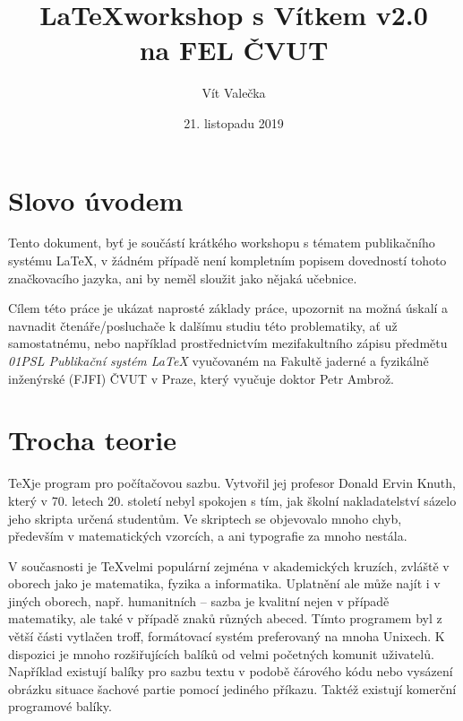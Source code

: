 \documentclass{article}
\title{\textbf{\LaTeX\enspace workshop s Vítkem v2.0}\\
	\uv{Studenti studentům} na FEL ČVUT}
\date{21. listopadu 2019}
\author{Vít Valečka}
\begin{document}
\maketitle
\thispagestyle{empty}

\vspace{30em}

\emph{}

\clearpage

\section*{Slovo úvodem}

Tento dokument, byť je součástí krátkého workshopu s tématem publikačního systému \LaTeX, v žádném případě není kompletním popisem dovedností tohoto značkovacího jazyka, ani by neměl sloužit jako nějaká učebnice.

Cílem této práce je ukázat naprosté základy práce, upozornit na možná úskalí a navnadit čtenáře/posluchače k dalšímu studiu této problematiky, ať už samostatnému, nebo například prostřednictvím mezifakultního zápisu předmětu \emph{01PSL Publikační systém \LaTeX} vyučovaném na Fakultě jaderné a fyzikálně inženýrské (FJFI) ČVUT v Praze, který vyučuje doktor Petr Ambrož.

\clearpage

\tableofcontents{}

\clearpage

\section{Trocha teorie}

\TeX\enspace je program pro počítačovou sazbu. Vytvořil jej profesor Donald Ervin Knuth, který v 70. letech 20. století nebyl spokojen s tím, jak školní nakladatelství sázelo jeho skripta určená studentům. Ve skriptech se objevovalo mnoho chyb, především v matematických vzorcích, a ani typografie za mnoho nestála.

V současnosti je \TeX\enspace velmi populární zejména v akademických kruzích, zvláště v oborech jako je matematika, fyzika a informatika. Uplatnění ale může najít i v jiných oborech, např. humanitních – sazba je kvalitní nejen v případě matematiky, ale také v případě znaků různých abeced. Tímto programem byl z větší části vytlačen troff, formátovací systém preferovaný na mnoha Unixech. K dispozici je mnoho rozšiřujících balíků od velmi početných komunit uživatelů. Například existují balíky pro sazbu textu v podobě čárového kódu nebo vysázení obrázku situace šachové partie pomocí jediného příkazu. Taktéž existují komerční programové balíky.
\end{document}
